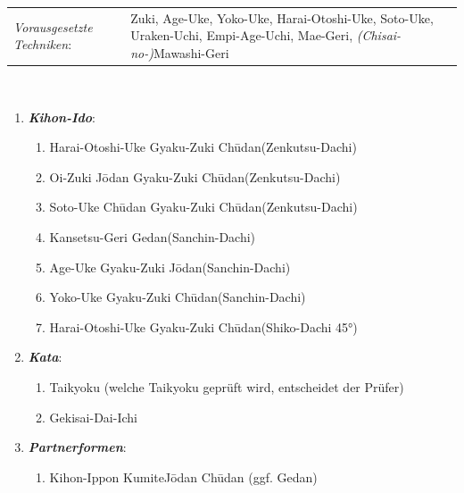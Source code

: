 \documentclass[a5paper,landscape,DIV=calc,11pt,notitlepage]{scrartcl}
\newcommand{\bull}{\,\textbullet\,}
\begin{document}
\pagebreak
\begin{tcolorbox}[colback=white,colframe=OBELT,coltitle=white,title=7. Kyu: Orange]
	\renewcommand{\labelenumi}{\alph{enumi}.)}
	\renewcommand{\labelenumii}{\arabic*.}
	{\scriptsize
		\begin{tabularx}{\textwidth}{lX}
			\textit{Vorausgesetzte Techniken}:& Zuki, Age-Uke, Yoko-Uke, Harai-Otoshi-Uke, Soto-Uke, Uraken-Uchi, Empi-Age-Uchi, Mae-Geri, \mbox{\textit{(Chisai-no-)}Mawashi-Geri}
		\end{tabularx}\\}\vspace{12pt}
	\begin{enumerate}[nosep]
		\item \textit{\textbf{Kihon-Ido}}:
		\begin{enumerate}[nosep]
			\item Harai-Otoshi-Uke\bull Gyaku-Zuki Ch\={u}dan\tabto{280pt}(Zenkutsu-Dachi)
			\item Oi-Zuki J\={o}dan\bull Gyaku-Zuki Ch\={u}dan\tabto{280pt}(Zenkutsu-Dachi)
			\item Soto-Uke Ch\={u}dan\bull Gyaku-Zuki Ch\={u}dan\tabto{280pt}(Zenkutsu-Dachi)
			\item Kansetsu-Geri Gedan\tabto{280pt}(Sanchin-Dachi)
			\item Age-Uke\bull Gyaku-Zuki J\={o}dan\tabto{280pt}(Sanchin-Dachi)
			\item Yoko-Uke\bull Gyaku-Zuki Ch\={u}dan\tabto{280pt}(Sanchin-Dachi)
			\item Harai-Otoshi-Uke\bull Gyaku-Zuki Ch\={u}dan\tabto{280pt}(Shiko-Dachi 45°)
		\end{enumerate}\vspace{24pt}
		\item \textit{\textbf{Kata}}:
		\begin{enumerate}[nosep]
			\item Taikyoku (welche Taikyoku geprüft wird, entscheidet der Prüfer)
			\item Gekisai-Dai-Ichi
		\end{enumerate}\vspace{24pt}
		\item \textit{\textbf{Partnerformen}}:
		\begin{enumerate}[nosep]
			\item Kihon-Ippon Kumite\tabto{280pt}J\={o}dan\bull Ch\={u}dan (ggf. Gedan)
		\end{enumerate}
	\end{enumerate}
\end{tcolorbox}
\end{document}
